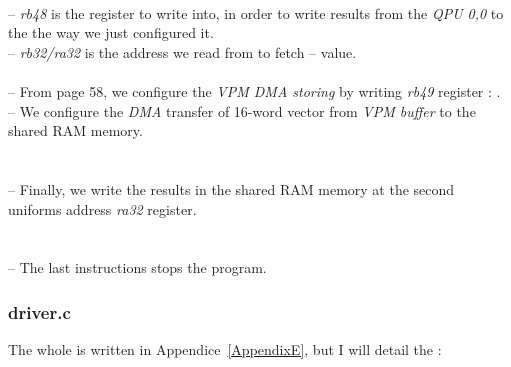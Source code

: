 \\
-- \emph{rb48} is the register to write into, in order to write results from the \emph{QPU 0,0} to the  the way we just configured it.\\
-- \emph{rb32/ra32} is the address we read from to fetch  --  value.\\

\\
-- From \parencite{refVC} page 58, we configure the \emph{VPM DMA storing} by writing \emph{rb49} register : .\\
-- We configure the \emph{DMA} transfer of 16-word vector from \emph{VPM buffer} to the shared RAM memory.\\

\\
\\
-- Finally, we write the results in the shared RAM memory at the second uniforms address \emph{ra32} register.\\

\\
\\
-- The last instructions stops the program.


\subsubsection{driver.c}

The whole  is written in Appendice~\ref{AppendixE}, but I will detail the :\\


